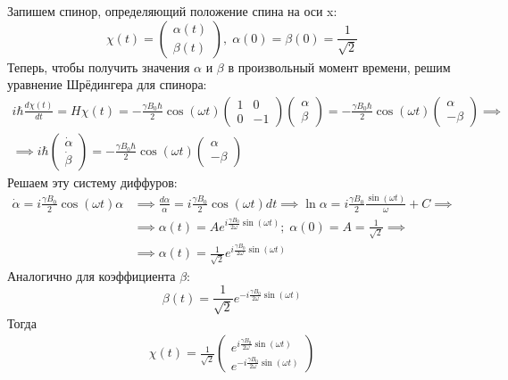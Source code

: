 Запишем спинор, определяющий положение спина на оси x:
\[
\chi(t) = \begin{pmatrix}\alpha(t)\\ \beta(t)\end{pmatrix}, \; \alpha(0) = \beta(0) = \frac{1}{\sqrt{2}}
\]
Теперь, чтобы получить значения $\alpha$ и $\beta$ в произвольный момент времени, решим уравнение Шрёдингера для спинора:
\begin{gather*}
i\hbar\frac{d\chi(t)}{dt} = H\chi(t) = -\frac{\gamma B_0\hbar}{2}\cos(\omega t)\begin{pmatrix} 1 & 0 \\ 0 & -1 \end{pmatrix}\begin{pmatrix}\alpha\\ \beta\end{pmatrix} =  -\frac{\gamma B_0\hbar}{2}\cos(\omega t) \begin{pmatrix} \alpha \\ -\beta \end{pmatrix} \implies \\
\implies i\hbar\begin{pmatrix} \dot{\alpha}\\ \dot{\beta} \end{pmatrix} = -\frac{\gamma B_0\hbar}{2}\cos(\omega t) \begin{pmatrix} \alpha \\ -\beta \end{pmatrix}
\end{gather*}
Решаем эту систему диффуров:
\begin{align*}
    \dot{\alpha} = i\frac{\gamma B_0}{2}\cos(\omega t)\alpha &\implies \frac{d\alpha}{\alpha} = i\frac{\gamma B_0}{2}\cos(\omega t)dt \implies \ln\alpha = i\frac{\gamma B_0}{2}\frac{\sin(\omega t)}{\omega} + C \implies \\ 
    & \implies \alpha(t) = Ae^{i\frac{\gamma B_0}{2\omega}\sin(\omega t)};\; \alpha(0) = A = \frac{1}{\sqrt{2}} \implies \\
    & \implies \alpha(t) = \frac{1}{\sqrt{2}}e^{i\frac{\gamma B_0}{2\omega}\sin(\omega t)}
\end{align*}
Аналогично для коэффициента $\beta$:
\[
\beta(t) = \frac{1}{\sqrt{2}}e^{-i\frac{\gamma B_0}{2\omega}\sin(\omega t)}
\]
Тогда
\begin{align*}
\chi(t) = \frac{1}{\sqrt{2}}\begin{pmatrix} e^{i\frac{\gamma B_0}{2\omega}\sin(\omega t)} \\ e^{-i\frac{\gamma B_0}{2\omega}\sin(\omega t)} \end{pmatrix}
\end{align*}

